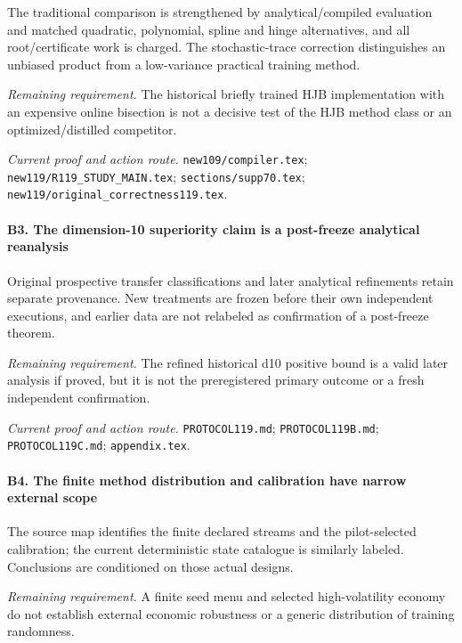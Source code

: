 The traditional comparison is strengthened by analytical/\allowbreak{}compiled evaluation and matched quadratic, polynomial, spline and hinge alternatives, and all root/\allowbreak{}certificate work is charged. The stochastic-trace correction distinguishes an unbiased product from a low-variance practical training method.

\par\emph{Remaining requirement.} The historical briefly trained HJB implementation with an expensive online bisection is not a decisive test of the HJB method class or an optimized/\allowbreak{}distilled competitor.

\par\emph{Current proof and action route.} \nolinkurl{new109/compiler.tex}; \nolinkurl{new119/R119_STUDY_MAIN.tex}; \nolinkurl{sections/supp70.tex}; \nolinkurl{new119/original_correctness119.tex}.

\paragraph{B3. The dimension-10 superiority claim is a post-freeze analytical reanalysis}

Original prospective transfer classifications and later analytical refinements retain separate provenance. New treatments are frozen before their own independent executions, and earlier data are not relabeled as confirmation of a post-freeze theorem.

\par\emph{Remaining requirement.} The refined historical d10 positive bound is a valid later analysis if proved, but it is not the preregistered primary outcome or a fresh independent confirmation.

\par\emph{Current proof and action route.} \nolinkurl{PROTOCOL119.md}; \nolinkurl{PROTOCOL119B.md}; \nolinkurl{PROTOCOL119C.md}; \nolinkurl{appendix.tex}.

\paragraph{B4. The finite method distribution and calibration have narrow external scope}

The source map identifies the finite declared streams and the pilot-selected calibration; the current deterministic state catalogue is similarly labeled. Conclusions are conditioned on those actual designs.

\par\emph{Remaining requirement.} A finite seed menu and selected high-volatility economy do not establish external economic robustness or a generic distribution of training randomness.


